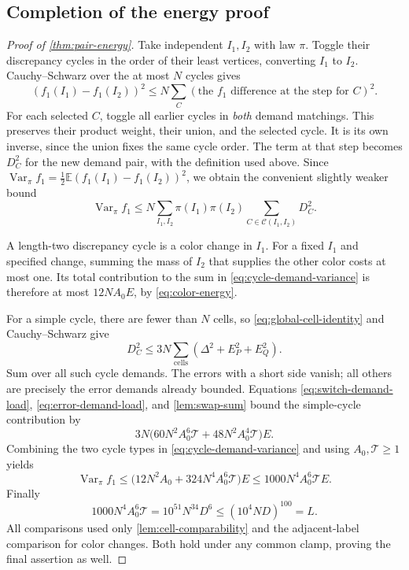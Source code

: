 \documentclass[11pt]{article}
\theoremstyle{definition}
\theoremstyle{remark}
\newcommand{\E}{\mathbb E}
\DeclareMathOperator{\Var}{Var}
\newcommand{\calT}{\mathcal T}
\numberwithin{equation}{section}
\begin{document}
\subsection{Completion of the energy proof}

\begin{proof}[Proof of \cref{thm:pair-energy}]
Take independent $I_1,I_2$ with law $\pi$.  Toggle their discrepancy
cycles in the order of their least vertices, converting $I_1$ to
$I_2$.  Cauchy--Schwarz over the at most $N$ cycles gives
\[
 (f_1(I_1)-f_1(I_2))^2
 \le N\sum_C
   (\text{the $f_1$ difference at the step for $C$})^2.
\]
For each selected $C$, toggle all earlier cycles in \emph{both}
demand matchings.  This preserves their product weight, their union,
and the selected cycle.  It is its own inverse, since the union fixes
the same cycle order.  The term at that step becomes $D_C^2$ for the
new demand pair, with the definition used above.  Since
$\Var_\pi f_1=\tfrac12\E(f_1(I_1)-f_1(I_2))^2$, we obtain the
convenient slightly weaker bound
\begin{equation}
\label{eq:cycle-demand-variance}
 \Var_\pi f_1\le
 N\sum_{I_1,I_2}\pi(I_1)\pi(I_2)
       \sum_{C\in\mathcal C(I_1,I_2)}D_C^2.
\end{equation}

A length-two discrepancy cycle is a color change in $I_1$.
For a fixed $I_1$ and specified change, summing the mass of $I_2$
that supplies the other color costs at most one.  Its total
contribution to the sum in \eqref{eq:cycle-demand-variance} is
therefore at most $12NA_0E$, by \eqref{eq:color-energy}.

For a simple cycle, there are fewer than $N$ cells, so
\eqref{eq:global-cell-identity} and Cauchy--Schwarz give
\[
 D_C^2\le3N\sum_{\text{cells}}
                 (\Delta^2+E_P^2+E_Q^2).
\]
Sum over all such cycle demands.  The errors with a short side
vanish; all others are precisely the error demands already bounded.
Equations \eqref{eq:switch-demand-load},
\eqref{eq:error-demand-load}, and \cref{lem:swap-sum} bound the
simple-cycle contribution by
\[
 3N\bigl(60N^2A_0^6\calT+48N^2A_0^4\calT\bigr)E.
\]
Combining the two cycle types in \eqref{eq:cycle-demand-variance}
and using $A_0,\calT\ge1$ yields
\[
 \Var_\pi f_1
 \le\bigl(12N^2A_0+324N^4A_0^6\calT\bigr)E
 \le1000N^4A_0^6\calT E.
\]
Finally
\[
 1000N^4A_0^6\calT
 =10^{51}N^{34}D^6
 \le(10^4ND)^{100}=L.
\]
All comparisons used only \cref{lem:cell-comparability} and the
adjacent-label comparison for color changes.  Both hold under any
common clamp, proving the final assertion as well.
\end{proof}
\end{document}
